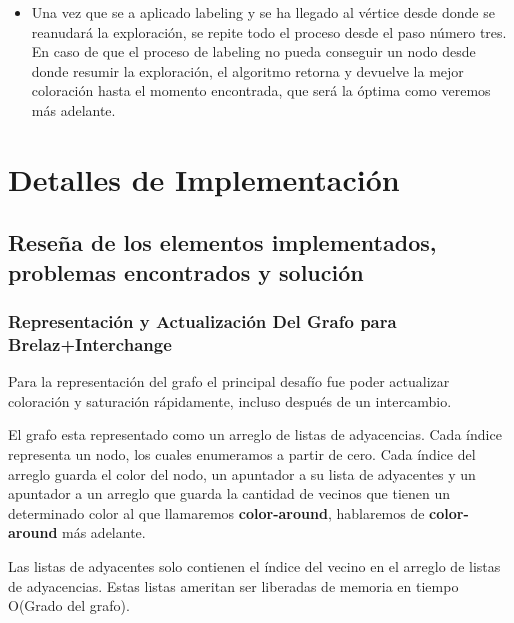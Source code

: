 \documentclass[a4paper,10pt]{article}
\begin{document}
\begin{itemize}
\begin{itemize}
	      coloreado con el color m\'as alto usado y se aplica el
	      proceso de labeling propuesto por Peemoller.
	\item Si se lleg\'o a un v\'ertice con un conjunto de colores
	      posibles vac\'io, se aplica el procedimento de labeling de
	      Peemoller directamente.
      \end{itemize}
\item Una vez que se a aplicado labeling y se ha llegado al v\'ertice
      desde donde se reanudará la exploraci\'on, se repite todo el
      proceso desde el paso n\'umero tres. En caso de que el proceso de
      labeling no pueda conseguir un nodo desde donde resumir la
      exploraci\'on, el algoritmo retorna y devuelve la mejor
      coloraci\'on hasta el momento encontrada, que ser\'a la \'optima
      como veremos m\'as adelante.
\end{itemize}
       
\newpage
\section{Detalles de Implementación}

\subsection{Reseña de los elementos implementados, problemas encontrados y solución}

\subsubsection{Representación y Actualización Del Grafo para Brelaz+Interchange}

Para la representación del grafo el principal desafío fue poder
actualizar coloración y saturación rápidamente, incluso después de un
intercambio.

El grafo esta representado como un arreglo de listas de
adyacencias. Cada índice representa un nodo, los cuales enumeramos a
partir de cero. Cada índice del arreglo guarda el color del nodo, un
apuntador a su lista de adyacentes y un apuntador a un arreglo que
guarda la cantidad de vecinos que tienen un determinado color al que
llamaremos \textbf{color-around}, hablaremos de \textbf{color-around}
más adelante.

Las listas de adyacentes solo contienen el índice del vecino en el
arreglo de listas de adyacencias. Estas listas ameritan ser liberadas de
memoria en tiempo O(Grado del grafo).
\end{document}
